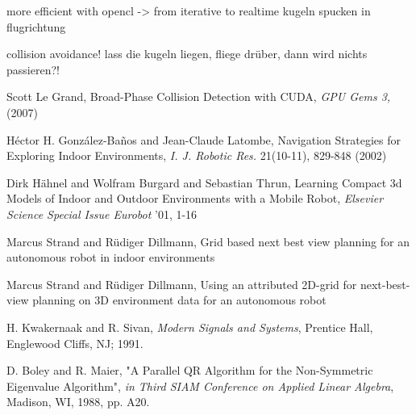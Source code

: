 \documentclass[a4paper, 10pt, conference]{ieeeconf}        %
\begin{document}
more efficient with opencl -> from iterative to realtime
kugeln spucken in flugrichtung

collision avoidance! lass die kugeln liegen, fliege drüber, dann wird nichts passieren?!


\begin{thebibliography}{99}




Scott Le Grand, Broad-Phase Collision Detection with CUDA, {\it GPU Gems 3, } (2007)

H\'{e}ctor H. Gonz\'{a}lez-Ba\~{n}os and Jean-Claude Latombe, Navigation Strategies for Exploring Indoor Environments, {\it I. J. Robotic Res.} 21(10-11), 829-848 (2002)

Dirk H\"ahnel and Wolfram Burgard and Sebastian Thrun, Learning Compact 3d Models of Indoor and Outdoor Environments with a Mobile Robot, {\it Elsevier Science Special Issue Eurobot} '01, 1-16

Marcus Strand and Rüdiger Dillmann, Grid based next best view planning for an autonomous robot in indoor environments

Marcus Strand and Rüdiger Dillmann, Using an attributed 2D-grid for next-best-view planning on 3D environment data for an autonomous robot

H. Kwakernaak and R. Sivan, {\it Modern Signals and Systems}, Prentice Hall, Englewood Cliffs, NJ; 1991.

D. Boley and R. Maier, "A Parallel QR Algorithm for the Non-Symmetric Eigenvalue Algorithm", {\it in Third SIAM Conference on Applied Linear Algebra}, Madison, WI, 1988, pp. A20.

\end{thebibliography}
\end{document}
